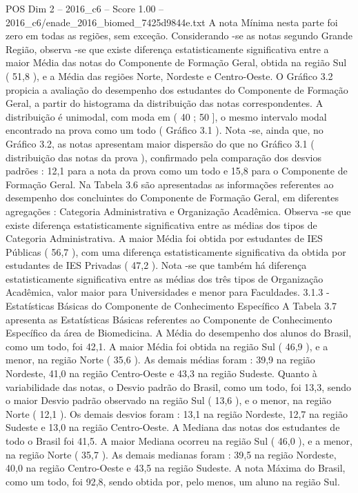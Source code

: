 \begin{textsample}{POS Dim 2 – 2016\_c6 – Score 1.00 – 2016\_c6/enade\_2016\_biomed\_7425d9844e.txt}
A nota Mínima nesta parte foi zero em todas as regiões, sem exceção.
Considerando -se as notas segundo Grande Região, observa -se que existe diferença estatisticamente significativa entre a maior Média das notas do Componente de Formação Geral, obtida na região Sul ( 51,8 ), e a Média das regiões Norte, Nordeste e Centro-Oeste.
O Gráfico 3.2 propicia a avaliação do desempenho dos estudantes do Componente de Formação Geral, a partir do histograma da distribuição das notas correspondentes.
A distribuição é unimodal, com moda em ( 40 ; 50 ], o mesmo intervalo modal encontrado na prova como um todo ( Gráfico 3.1 ).
Nota -se, ainda que, no Gráfico 3.2, as notas apresentam maior dispersão do que no Gráfico 3.1 ( distribuição das notas da prova ), confirmado pela comparação dos desvios padrões : 12,1 para a nota da prova como um todo e 15,8 para o Componente de Formação Geral.
Na Tabela 3.6 são apresentadas as informações referentes ao desempenho dos concluintes do Componente de Formação Geral, em diferentes agregações : Categoria Administrativa e Organização Acadêmica.
Observa -se que existe diferença estatisticamente significativa entre as médias dos tipos de Categoria Administrativa.
A maior Média foi obtida por estudantes de IES Públicas ( 56,7 ), com uma diferença estatisticamente significativa da obtida por estudantes de IES Privadas ( 47,2 ).
Nota -se que também há diferença estatisticamente significativa entre as médias dos três tipos de Organização Acadêmica, valor maior para Universidades e menor para Faculdades. 3.1.3 - Estatísticas Básicas do Componente de Conhecimento Específico A Tabela 3.7 apresenta as Estatísticas Básicas referentes ao Componente de Conhecimento Específico da área de Biomedicina.
A Média do desempenho dos alunos do Brasil, como um todo, foi 42,1.
A maior Média foi obtida na região Sul ( 46,9 ), e a menor, na região Norte ( 35,6 ).
As demais médias foram : 39,9 na região Nordeste, 41,0 na região Centro-Oeste e 43,3 na região Sudeste.
Quanto à variabilidade das notas, o Desvio padrão do Brasil, como um todo, foi 13,3, sendo o maior Desvio padrão observado na região Sul ( 13,6 ), e o menor, na região Norte ( 12,1 ).
Os demais desvios foram : 13,1 na região Nordeste, 12,7 na região Sudeste e 13,0 na região Centro-Oeste.
A Mediana das notas dos estudantes de todo o Brasil foi 41,5.
A maior Mediana ocorreu na região Sul ( 46,0 ), e a menor, na região Norte ( 35,7 ).
As demais medianas foram : 39,5 na região Nordeste, 40,0 na região Centro-Oeste e 43,5 na região Sudeste.
A nota Máxima do Brasil, como um todo, foi 92,8, sendo obtida por, pelo menos, um aluno na região Sul.

\end{textsample}
